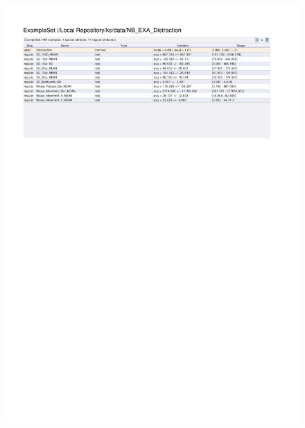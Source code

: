 \begin{figure}[htp]
  \centerline{\includegraphics[trim=0 630 0 60,clip,width=16.09cm]{results/NB_EXA_Distraction.pdf}} \caption{
} \label{NB_K_Distraction}
\end{figure}

